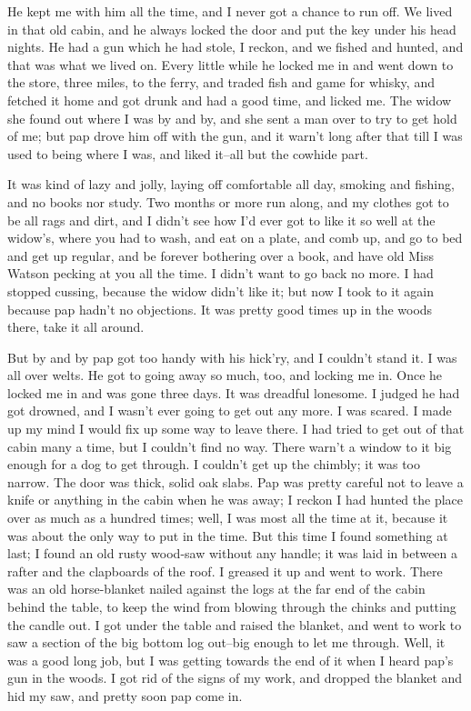 He kept me with him all the time, and I never got a chance to run off.
We lived in that old cabin, and he always locked the door and put the key
under his head nights.  He had a gun which he had stole, I reckon, and we
fished and hunted, and that was what we lived on.  Every little while he
locked me in and went down to the store, three miles, to the ferry, and
traded fish and game for whisky, and fetched it home and got drunk and
had a good time, and licked me.  The widow she found out where I was by
and by, and she sent a man over to try to get hold of me; but pap drove
him off with the gun, and it warn't long after that till I was used to
being where I was, and liked it--all but the cowhide part.

It was kind of lazy and jolly, laying off comfortable all day, smoking
and fishing, and no books nor study.  Two months or more run along, and
my clothes got to be all rags and dirt, and I didn't see how I'd ever got
to like it so well at the widow's, where you had to wash, and eat on a
plate, and comb up, and go to bed and get up regular, and be forever
bothering over a book, and have old Miss Watson pecking at you all the
time.  I didn't want to go back no more.  I had stopped cussing, because
the widow didn't like it; but now I took to it again because pap hadn't
no objections.  It was pretty good times up in the woods there, take it
all around.

But by and by pap got too handy with his hick'ry, and I couldn't stand
it. I was all over welts.  He got to going away so much, too, and locking
me in.  Once he locked me in and was gone three days.  It was dreadful
lonesome.  I judged he had got drowned, and I wasn't ever going to get
out any more.  I was scared.  I made up my mind I would fix up some way
to leave there.  I had tried to get out of that cabin many a time, but I
couldn't find no way.  There warn't a window to it big enough for a dog
to get through.  I couldn't get up the chimbly; it was too narrow.  The
door was thick, solid oak slabs.  Pap was pretty careful not to leave a
knife or anything in the cabin when he was away; I reckon I had hunted
the place over as much as a hundred times; well, I was most all the time
at it, because it was about the only way to put in the time.  But this
time I found something at last; I found an old rusty wood-saw without any
handle; it was laid in between a rafter and the clapboards of the roof.
I greased it up and went to work.  There was an old horse-blanket nailed
against the logs at the far end of the cabin behind the table, to keep
the wind from blowing through the chinks and putting the candle out.  I
got under the table and raised the blanket, and went to work to saw a
section of the big bottom log out--big enough to let me through.  Well,
it was a good long job, but I was getting towards the end of it when I
heard pap's gun in the woods.  I got rid of the signs of my work, and
dropped the blanket and hid my saw, and pretty soon pap come in.

